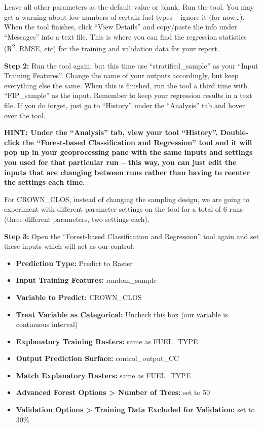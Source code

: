 \documentclass[
]{book}
\providecommand{\tightlist}{%
  \setlength{\itemsep}{0pt}\setlength{\parskip}{0pt}}
\begin{document}
Leave all other parameters as the default value or blank. Run the tool. You may get a warning about low numbers of certain fuel types -- ignore it (for now\ldots). When the tool finishes, click ``View Details'' and copy/paste the info under ``Messages'' into a text file. This is where you can find the regression statistics (R\textsuperscript{2}, RMSE, etc) for the training and validation data for your report.

\textbf{Step 2:} Run the tool again, but this time use ``stratified\_sample'' as your ``Input Training Features''. Change the name of your outputs accordingly, but keep everything else the same. When this is finished, run the tool a third time with ``FIP\_sample'' as the input. Remember to keep your regression results in a text file. If you do forget, just go to ``History'' under the ``Analysis'' tab and hover over the tool.

\textbf{HINT: Under the ``Analysis'' tab, view your tool ``History''. Double-click the ``Forest-based Classification and Regression'' tool and it will pop up in your geoprocessing pane with the same inputs and settings you used for that particular run -- this way, you can just edit the inputs that are changing between runs rather than having to reenter the settings each time.}

For CROWN\_CLOS, instead of changing the sampling design, we are going to experiment with different parameter settings on the tool for a total of 6 runs (three different parameters, two settings each).

\textbf{Step 3:} Open the ``Forest-based Classification and Regression'' tool again and set these inputs which will act as our control:

\begin{itemize}
\tightlist
\item
  \textbf{Prediction Type:} Predict to Raster
\item
  \textbf{Input Training Features:} random\_sample
\item
  \textbf{Variable to Predict:} CROWN\_CLOS
\item
  \textbf{Treat Variable as Categorical:} Uncheck this box (our variable is continuous interval)
\item
  \textbf{Explanatory Training Rasters:} same as FUEL\_TYPE
\item
  \textbf{Output Prediction Surface:} control\_output\_CC
\item
  \textbf{Match Explanatory Rasters:} same as FUEL\_TYPE
\item
  \textbf{Advanced Forest Options \textgreater{} Number of Trees:} set to 50
\item
  \textbf{Validation Options \textgreater{} Training Data Excluded for Validation:} set to 30\%
\end{itemize}
\end{document}
